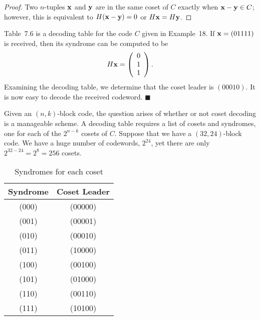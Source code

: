  
\begin{proof}
Two $n$-tuples ${\bold x}$ and ${\bold y}$ are in the same coset of
$C$ exactly when ${\bold x} - {\bold y} \in C$; however, this is
equivalent to $H({\bold x} - {\bold y}) = 0$ or $H {\bold x} = H
{\bold y}$. 
\end{proof}
 
 
\vspace{2ex}
 
 
Table~7.6 is a decoding table for the code $C$ given in Example~18. If
${\bold x} = (01111)$ is received, then its syndrome can be computed
to be
\[
H {\bold x} =
\left(
\begin{array}{c}
0 \\
1 \\
1
\end{array}
\right).
\]
Examining the decoding table, we determine that the coset leader is
$(00010)$. It is now easy to decode the received codeword. 
\hspace{\fill} $\blacksquare$
 
 
\vspace{2ex}
 
 
Given an $(n,k)$-block code, the question arises of whether or not
coset decoding is a manageable scheme.  A decoding table requires a
list of cosets and syndromes, one for each of the $2^{n-k}$ cosets of
$C$.  Suppose that we have a $(32, 24)$-block code.  We have a huge
number of codewords, $2^{24}$, yet there are only $2^{32-24} = 2^{8} =
256$ cosets.  
 
\begin{table}[htb]
\caption{Syndromes for each coset}{\small
\begin{center}
\begin{tabular}{|c|c|}
\hline
Syndrome & Coset Leader \\
\hline
(000) & (00000) \\
(001) & (00001) \\
(010) & (00010) \\
(011) & (10000) \\
(100) & (00100) \\
(101) & (01000) \\
(110) & (00110) \\
(111) & (10100) \\
\hline
\end{tabular}
\end{center}
}
\end{table}
 
 
 
